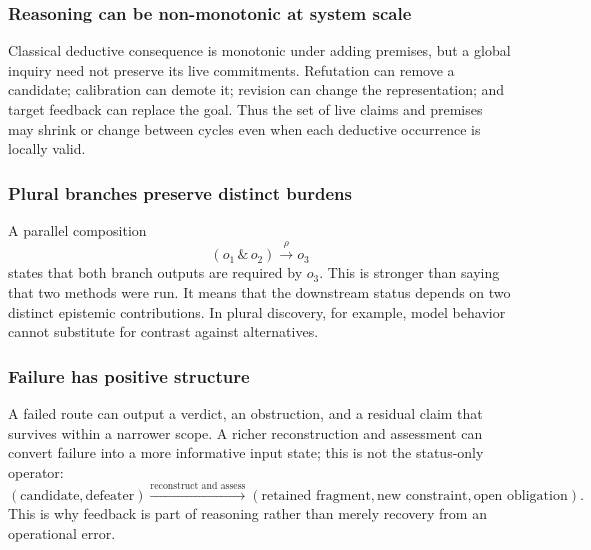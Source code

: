 \subsubsection{Reasoning can be non-monotonic at system scale}

Classical deductive consequence is monotonic under adding premises, but a global
inquiry need not preserve its live commitments. Refutation can remove a candidate; calibration can demote it;
revision can change the representation; and target feedback can replace the
goal. Thus the set of live claims and premises may shrink or change between
cycles even when each deductive occurrence is locally valid.

\subsubsection{Plural branches preserve distinct burdens}

A parallel composition
\[
  (o_1\,\&\,o_2)\xrightarrow{\rho}o_3
\]
states that both branch outputs are required by $o_3$. This is stronger than
saying that two methods were run. It means that the downstream status depends
on two distinct epistemic contributions. In plural discovery, for example,
model behavior cannot substitute for contrast against alternatives.

\subsubsection{Failure has positive structure}

A failed route can output a verdict, an obstruction, and a residual claim that
survives within a narrower scope. A richer reconstruction and assessment can convert failure
into a more informative input state; this is not the status-only operator:
\[
  (\text{candidate},\text{defeater})
  \xrightarrow{\text{reconstruct and assess}}
  (\text{retained fragment},\text{new constraint},\text{open obligation}).
\]
This is why feedback is part of reasoning rather than merely recovery from an
operational error.
